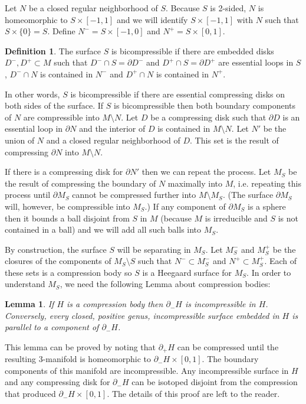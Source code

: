 \documentclass[12pt]{amsart}
\theoremstyle{plain}
\newtheorem{Lem}[Thm]{Lemma}
\theoremstyle{definition}
\newtheorem{Def}[Thm]{Definition}
\begin{document}
Let $N$ be a closed regular neighborhood of $S$.  Because $S$ is 2-sided, $N$ is homeomorphic to $S \times [-1,1]$ and we will identify $S \times [-1,1]$ with $N$ such that $S \times \{0\} = S$.  Define $N^- = S \times [-1,0]$ and $N^+ = S \times [0,1]$.

\begin{Def}
The surface $S$ is bicompressible if there are embedded disks $D^-, D^+ \subset M$ such that $D^- \cap S = \partial D^-$ and $D^+ \cap S = \partial D^+$ are essential loops in $S$, $D^- \cap N$ is contained in $N^-$ and $D^+ \cap N$ is contained in $N^+$.
\end{Def}

In other words, $S$ is bicompressible if there are essential compressing disks on both sides of the surface.  If $S$ is bicompressible then both boundary components of $N$ are compressible into $M \setminus N$.  Let $D$ be a compressing disk such that $\partial D$ is an essential loop in $\partial N$ and the interior of $D$ is contained in $M \setminus N$.  Let $N'$ be the union of $N$ and a closed regular neighborhood of $D$.  This set is the result of compressing $\partial N$ into $M \setminus N$.  

If there is a compressing disk for $\partial N'$ then we can repeat the process.  Let $M_S$ be the result of compressing the boundary of $N$ maximally into $M$, i.e. repeating this process until $\partial M_S$ cannot be compressed further into $M \setminus M_S$.  (The surface $\partial M_S$ will, however, be compressible into $M_S$.)  If any component of $\partial M_S$ is a sphere then it bounds a ball disjoint from $S$ in $M$ (because $M$ is irreducible and $S$ is not contained in a ball) and we will add all such balls into $M_S$.

By construction, the surface $S$ will be separating in $M_S$.  Let $M_S^-$ and $M_S^+$ be the closures of the components of $M_S \setminus S$ such that $N^- \subset M_S^-$ and $N^+ \subset M_S^+$.  Each of these sets is a compression body so $S$ is a Heegaard surface for $M_S$.  In order to understand $M_S$, we need the following Lemma about compression bodies:

\begin{Lem}
\label{cbodyincomplem}
If $H$ is a compression body then $\partial_- H$ is incompressible in $H$.  Conversely, every closed, positive genus, incompressible surface embedded in $H$ is parallel to a component of $\partial_- H$.
\end{Lem}

This lemma can be proved by noting that $\partial_+ H$ can be compressed until the resulting 3-manifold is homeomorphic to $\partial_- H \times [0,1]$.  The boundary components of this manifold are incompressible.  Any incompressible surface in $H$ and any compressing disk for $\partial_- H$ can be isotoped disjoint from the compression that produced $\partial_- H \times [0,1]$.  The details of this proof are left to the reader.
\end{document}
